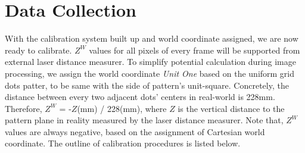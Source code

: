 \section{Data Collection}
\label{perpixelDataCollection}
%
With the calibration system built up and world coordinate assigned, we are now ready to calibrate. \(Z^{W}\) values for all pixels of every frame will be supported from external laser distance measurer. To simplify potential calculation during image processing, we assign the world coordinate \emph{Unit One} based on the uniform grid dots patter, to be same with the side of pattern's unit-square. Concretely, the distance between every two adjacent dots' centers in real-world is 228mm. Therefore, \(Z^{W}\) = -\(Z\)(mm) / 228(mm), where \(Z\) is the vertical distance to the pattern plane in reality measured by the laser distance measurer. Note that, \(Z^{W}\) values are always negative, based on the assignment of Cartesian world coordinate. The outline of calibration procedures is listed below.
%
